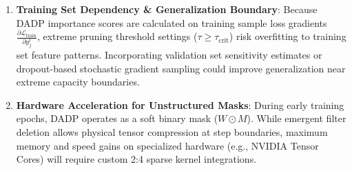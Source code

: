 \begin{enumerate}
    \item \textbf{Training Set Dependency \& Generalization Boundary}: Because DADP importance scores are calculated on training sample loss gradients $\frac{\partial \mathcal{L}_{\text{train}}}{\partial y_j^l}$, extreme pruning threshold settings ($\tau \ge \tau_{\text{crit}}$) risk overfitting to training set feature patterns. Incorporating validation set sensitivity estimates or dropout-based stochastic gradient sampling could improve generalization near extreme capacity boundaries.
    \item \textbf{Hardware Acceleration for Unstructured Masks}: During early training epochs, DADP operates as a soft binary mask ($W \odot M$). While emergent filter deletion allows physical tensor compression at step boundaries, maximum memory and speed gains on specialized hardware (e.g., NVIDIA Tensor Cores) will require custom 2:4 sparse kernel integrations.
\end{enumerate}
